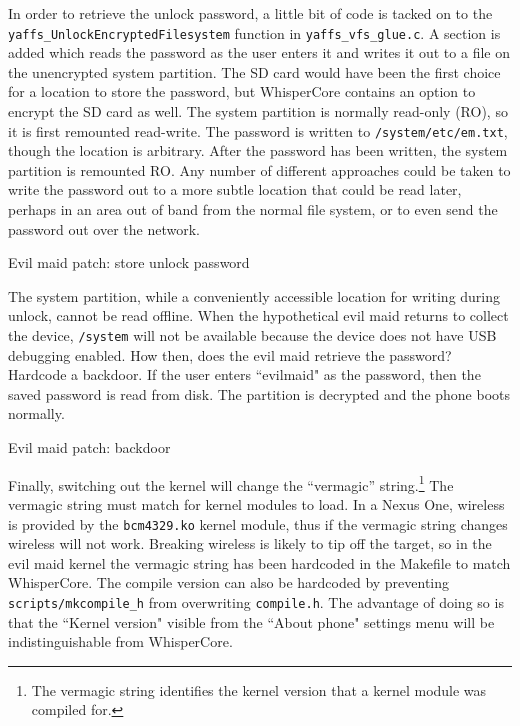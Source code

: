 In order to retrieve the unlock password, a little bit of code is tacked on to the \texttt{yaffs\_UnlockEncryptedFilesystem}
function in \texttt{yaffs\_vfs\_glue.c}. A section is added which reads the password as the user enters it and writes it out to a
file on the unencrypted system partition.  The SD card would have been the first choice for a location to store the password, but
WhisperCore contains an option to encrypt the SD card as well. The system partition is normally read-only (RO), so it is first
remounted read-write. The password is written to \texttt{/system/etc/em.txt}, though the location is arbitrary. After the password
has been written, the system partition is remounted RO. Any number of different approaches could be taken to write the password out
to a more subtle location that could be read later, perhaps in an area out of band from the normal file system, or to even send the
password out over the network. 

\begin{table}[htb]

\label{tab:storepass}
\caption{Evil maid patch: store unlock password}
\end{table}

The system partition, while a conveniently accessible location for writing during unlock, cannot be read offline.  When the
hypothetical evil maid returns to collect the device, \texttt{/system} will not be available because the device does not have USB
debugging enabled.  How then, does the evil maid retrieve the password? Hardcode a backdoor.  If the user enters ``evilmaid" as the
password, then the saved password is read from disk.  The partition is decrypted and the phone boots normally. 

\begin{table}[htb]

\label{tab:backdoor}
\caption{Evil maid patch: backdoor}
\end{table}

Finally, switching out the kernel will change the ``vermagic'' string.\footnote{The vermagic string identifies the kernel version
that a kernel module was compiled for.} The vermagic string must match for kernel modules to load.  In a Nexus One, wireless is
provided by the \texttt{bcm4329.ko} kernel module, thus if the vermagic string changes wireless will not work.  Breaking wireless is likely
to tip off the target, so in the evil maid kernel the vermagic string has been hardcoded in the Makefile to match WhisperCore. 
The compile version can also be hardcoded by preventing \texttt{scripts/mkcompile\_h} from overwriting \texttt{compile.h}. 
The advantage of doing so is that the ``Kernel version" visible from the ``About phone" settings menu will be indistinguishable from WhisperCore.

